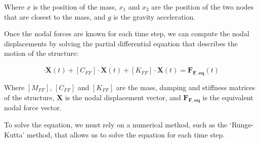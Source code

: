 Where $x$ is the position of the mass, $x_1$ and $x_2$ are the position of the two nodes that are closest to the mass, and $g$ is the gravity acceleration.

Once the nodal forces are known for each time step, we can compute the nodal displacements by solving the partial differential equation that describes the motion of the structure:

\begin{equation}
    [M_{FF}] \cdot \mathbf{\ddot{X}}(t) + [C_{FF}] \cdot \mathbf{\dot{X}}(t) + [K_{FF}] \cdot \mathbf{X}(t) = \mathbf{F_{F, eq}}(t)
    \label{eq:dynamic_equation}
\end{equation}

Where $[M_{FF}]$, $[C_{FF}]$ and $[K_{FF}]$ are the mass, damping and stiffness matrices of the structure, $\mathbf{X}$ is the nodal displacement vector, and $\mathbf{F_{F, eq}}$ is the equivalent nodal force vector.

To solve the equation, we must rely on a numerical method, such as the `Runge-Kutta' method, that allows us to solve the equation for each time step.
